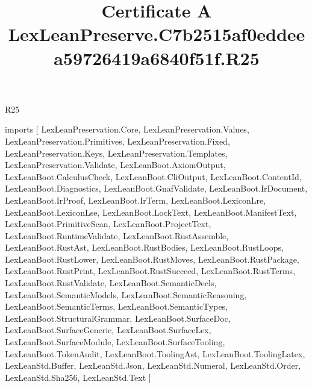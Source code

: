 \begin{lexlean}{R25}
\title{Certificate A LexLeanPreserve.C7b2515af0eddeea59726419a6840f51f.R25}
\begin{coremodule}
imports [
  LexLeanPreservation.Core,
  LexLeanPreservation.Values,
  LexLeanPreservation.Primitives,
  LexLeanPreservation.Fixed,
  LexLeanPreservation.Keys,
  LexLeanPreservation.Templates,
  LexLeanPreservation.Validate,
  LexLeanBoot.AxiomOutput,
  LexLeanBoot.CalculusCheck,
  LexLeanBoot.CliOutput,
  LexLeanBoot.ContentId,
  LexLeanBoot.Diagnostics,
  LexLeanBoot.GnafValidate,
  LexLeanBoot.IrDocument,
  LexLeanBoot.IrProof,
  LexLeanBoot.IrTerm,
  LexLeanBoot.LexiconLre,
  LexLeanBoot.LexiconLse,
  LexLeanBoot.LockText,
  LexLeanBoot.ManifestText,
  LexLeanBoot.PrimitiveScan,
  LexLeanBoot.ProjectText,
  LexLeanBoot.RuntimeValidate,
  LexLeanBoot.RustAssemble,
  LexLeanBoot.RustAst,
  LexLeanBoot.RustBodies,
  LexLeanBoot.RustLoops,
  LexLeanBoot.RustLower,
  LexLeanBoot.RustMoves,
  LexLeanBoot.RustPackage,
  LexLeanBoot.RustPrint,
  LexLeanBoot.RustSucceed,
  LexLeanBoot.RustTerms,
  LexLeanBoot.RustValidate,
  LexLeanBoot.SemanticDecls,
  LexLeanBoot.SemanticModels,
  LexLeanBoot.SemanticReasoning,
  LexLeanBoot.SemanticTerms,
  LexLeanBoot.SemanticTypes,
  LexLeanBoot.StructuralGrammar,
  LexLeanBoot.SurfaceDoc,
  LexLeanBoot.SurfaceGeneric,
  LexLeanBoot.SurfaceLex,
  LexLeanBoot.SurfaceModule,
  LexLeanBoot.SurfaceTooling,
  LexLeanBoot.TokenAudit,
  LexLeanBoot.ToolingAst,
  LexLeanBoot.ToolingLatex,
  LexLeanStd.Buffer,
  LexLeanStd.Json,
  LexLeanStd.Numeral,
  LexLeanStd.Order,
  LexLeanStd.Sha256,
  LexLeanStd.Text
]


\end{coremodule}
\end{lexlean}
